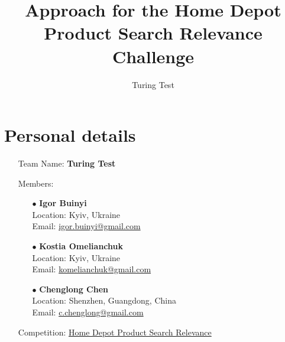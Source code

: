 \documentclass[12pt]{article}
\begin{document}
\title{Approach for the Home Depot Product Search Relevance Challenge}
\author{Turing Test}
\maketitle



\begin{comment}
\section*{Personal details}
\begin{itemize}
\item Team Name: Turing Test
\item Team Members: Chenglong Chen, Kostia
\item Email: \url{c.chenglong@gmail.com}
\item Competition: \href{https://www.kaggle.com/c/home-depot-product-search-relevance}{Home Depot Product Search Relevance}
\end{itemize}
\end{comment}

\section*{Personal details}
\begin{itemize}
\item[] Team Name: \textbf{Turing Test}
\item[] Members:
\begin{itemize}
\item[$\bullet$] \textbf{Igor Buinyi} \\
	 Location: Kyiv, Ukraine \\
	Email: \url{igor.buinyi@gmail.com}
\item[$\bullet$] \textbf{Kostia Omelianchuk} \\
	 Location: Kyiv, Ukraine \\
	Email: \url{komelianchuk@gmail.com}
\item[$\bullet$] \textbf{Chenglong Chen} \\
	 Location: Shenzhen, Guangdong, China\\
	Email: \url{c.chenglong@gmail.com}
\end{itemize}
\item[] Competition: \href{https://www.kaggle.com/c/home-depot-product-search-relevance}{Home Depot Product Search Relevance}
\end{itemize}
\end{document}
